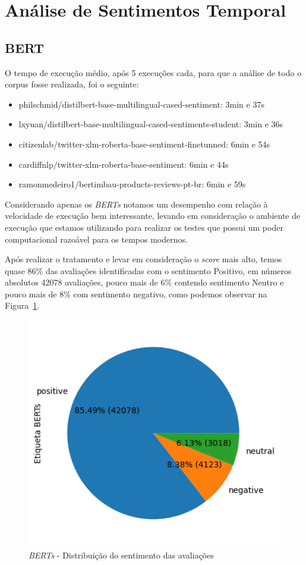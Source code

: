 \section{Análise de Sentimentos Temporal}
\label{cap:resultados:sec:analise_sentimento}

\subsection[BERT]{BERT}
\label{sec:resultados:subsec:bert}

O tempo de execução médio, após 5 execuções cada, para que a análise de todo o corpus fosse realizada, foi o seguinte:

\begin{itemize}
	\item philschmid/distilbert-base-multilingual-cased-sentiment: 3min e 37s
	\item lxyuan/distilbert-base-multilingual-cased-sentiments-student: 3min e 36s
	\item citizenlab/twitter-xlm-roberta-base-sentiment-finetunned: 6min e 54s
	\item cardiffnlp/twitter-xlm-roberta-base-sentiment: 6min e 44s
	\item ramonmedeiro1/bertimbau-products-reviews-pt-br: 6min e 59s
\end{itemize}

Considerando apenas os \textit{BERTs} notamos um desempenho com relação à velocidade de execução bem interessante, levando em consideração o ambiente de execução que estamos utilizando para realizar os testes que possui um poder computacional razoável para os tempos modernos.

Após realizar o tratamento e levar em consideração o \textit{score} mais alto, temos quase 86\% das avaliações identificadas com o sentimento Positivo, em números absolutos 42078 avaliações, pouco mais de 6\% contendo sentimento Neutro e pouco mais de 8\% com sentimento negativo, como podemos observar na Figura~\ref{img:sentimento_bert}.

\begin{figure}
	\centering
	\includegraphics{figs/bert/distribuicao_pizza.png}
	\caption{\textit{BERTs} - Distribuição do sentimento das avaliações}
	\label{img:sentimento_bert}
\end{figure}

